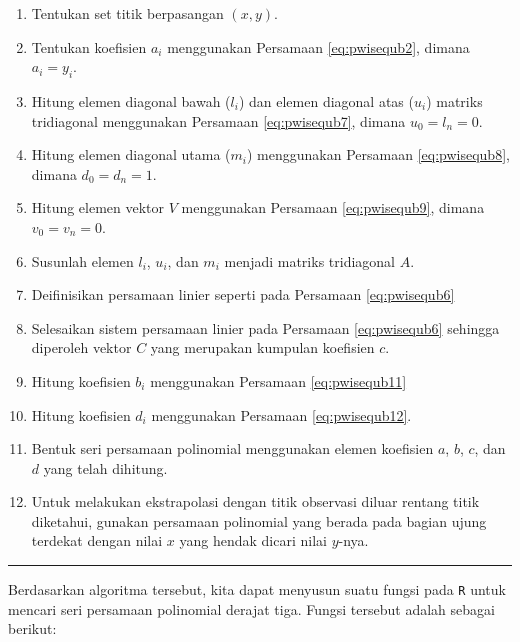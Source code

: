 \documentclass[]{book}
\providecommand{\tightlist}{%
  \setlength{\itemsep}{0pt}\setlength{\parskip}{0pt}}
\theoremstyle{definition}
\theoremstyle{definition}
\theoremstyle{definition}
\theoremstyle{remark}
\begin{document}
\begin{enumerate}
\def\labelenumi{\arabic{enumi}.}
\tightlist
\item
  Tentukan set titik berpasangan \(\left(x,y\right)\).
\item
  Tentukan koefisien \(a_i\) menggunakan Persamaan \eqref{eq:pwisequb2}, dimana \(a_i = y_i\).
\item
  Hitung elemen diagonal bawah (\(l_i\)) dan elemen diagonal atas (\(u_i\)) matriks tridiagonal menggunakan Persamaan \eqref{eq:pwisequb7}, dimana \(u_0=l_n=0\).
\item
  Hitung elemen diagonal utama (\(m_i\)) menggunakan Persamaan \eqref{eq:pwisequb8}, dimana \(d_0=d_n=1\).
\item
  Hitung elemen vektor \(V\) menggunakan Persamaan \eqref{eq:pwisequb9}, dimana \(v_0=v_n=0\).
\item
  Susunlah elemen \(l_i\), \(u_i\), dan \(m_i\) menjadi matriks tridiagonal \(A\).
\item
  Deifinisikan persamaan linier seperti pada Persamaan \eqref{eq:pwisequb6}
\item
  Selesaikan sistem persamaan linier pada Persamaan \eqref{eq:pwisequb6} sehingga diperoleh vektor \(C\) yang merupakan kumpulan koefisien \(c\).
\item
  Hitung koefisien \(b_i\) menggunakan Persamaan \eqref{eq:pwisequb11}
\item
  Hitung koefisien \(d_i\) menggunakan Persamaan \eqref{eq:pwisequb12}.
\item
  Bentuk seri persamaan polinomial menggunakan elemen koefisien \(a\), \(b\), \(c\), dan \(d\) yang telah dihitung.
\item
  Untuk melakukan ekstrapolasi dengan titik observasi diluar rentang titik diketahui, gunakan persamaan polinomial yang berada pada bagian ujung terdekat dengan nilai \(x\) yang hendak dicari nilai \(y\)-nya.
\end{enumerate}

\begin{center}\rule{0.5\linewidth}{\linethickness}\end{center}

Berdasarkan algoritma tersebut, kita dapat menyusun suatu fungsi pada \texttt{R} untuk mencari seri persamaan polinomial derajat tiga. Fungsi tersebut adalah sebagai berikut:
\end{document}
